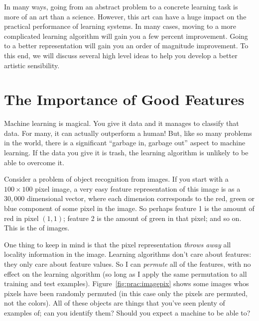 In many ways, going from an abstract problem to a concrete learning
task is more of an art than a science.  However, this art can have a
huge impact on the practical performance of learning systems.  In many
cases, moving to a more complicated learning algorithm will gain you a
few percent improvement.  Going to a better representation will gain
you an order of magnitude improvement.  To this end, we will discuss
several high level ideas to help you develop a better artistic
sensibility.

\section{The Importance of Good Features}

Machine learning is magical.  You give it data and it manages to
classify that data.  For many, it can actually outperform a human!
But, like so many problems in the world, there is a significant
``garbage in, garbage out'' aspect to machine learning.  If the data
you give it is trash, the learning algorithm is unlikely to be able to
overcome it.

Consider a problem of object recognition from images.  If you start
with a $100 \times 100$ pixel image, a very easy feature
representation of this image is as a $30,000$ dimensional vector,
where each dimension corresponds to the red, green or blue component
of some pixel in the image.  So perhaps feature 1 is the amount of red
in pixel $(1,1)$; feature 2 is the amount of green in that pixel; and
so on.  This is the  of images.


One thing to keep in mind is that the pixel representation
\emph{throws away} all locality information in the image.  Learning
algorithms don't care about features: they only care about feature
values.  So I can \emph{permute} all of the features, with no effect
on the learning algorithm (so long as I apply the same permutation to
all training and test examples).  Figure~\ref{fig:prac:imagepix} shows
some images whos pixels have been randomly permuted (in this case only
the pixels are permuted, not the colors).  All of these objects are
things that you've seen plenty of examples of; can you identify them?
Should you expect a machine to be able to?


